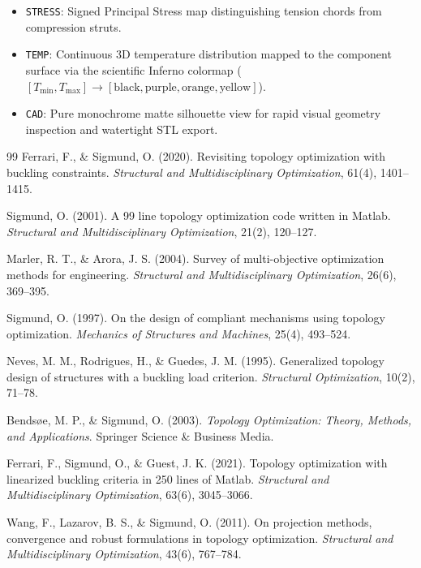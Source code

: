 \documentclass[11pt, a4paper]{article}
\begin{document}
\begin{enumerate}
    \begin{itemize}
        \item \texttt{STRESS}: Signed Principal Stress map distinguishing tension chords from compression struts.
        \item \texttt{TEMP}: Continuous 3D temperature distribution mapped to the component surface via the scientific Inferno colormap ($[T_{\min}, T_{\max}] \to [\text{black}, \text{purple}, \text{orange}, \text{yellow}]$).
        \item \texttt{CAD}: Pure monochrome matte silhouette view for rapid visual geometry inspection and watertight STL export.
    \end{itemize}
\end{enumerate}

\begin{thebibliography}{99}
Ferrari, F., \& Sigmund, O. (2020). Revisiting topology optimization with buckling constraints. \textit{Structural and Multidisciplinary Optimization}, 61(4), 1401--1415.

Sigmund, O. (2001). A 99 line topology optimization code written in Matlab. \textit{Structural and Multidisciplinary Optimization}, 21(2), 120--127.

Marler, R. T., \& Arora, J. S. (2004). Survey of multi-objective optimization methods for engineering. \textit{Structural and Multidisciplinary Optimization}, 26(6), 369--395.

Sigmund, O. (1997). On the design of compliant mechanisms using topology optimization. \textit{Mechanics of Structures and Machines}, 25(4), 493--524.

Neves, M. M., Rodrigues, H., \& Guedes, J. M. (1995). Generalized topology design of structures with a buckling load criterion. \textit{Structural Optimization}, 10(2), 71--78.

Bendsøe, M. P., \& Sigmund, O. (2003). \textit{Topology Optimization: Theory, Methods, and Applications}. Springer Science \& Business Media.

Ferrari, F., Sigmund, O., \& Guest, J. K. (2021). Topology optimization with linearized buckling criteria in 250 lines of Matlab. \textit{Structural and Multidisciplinary Optimization}, 63(6), 3045--3066.

Wang, F., Lazarov, B. S., \& Sigmund, O. (2011). On projection methods, convergence and robust formulations in topology optimization. \textit{Structural and Multidisciplinary Optimization}, 43(6), 767--784.


\end{thebibliography}
\end{document}
